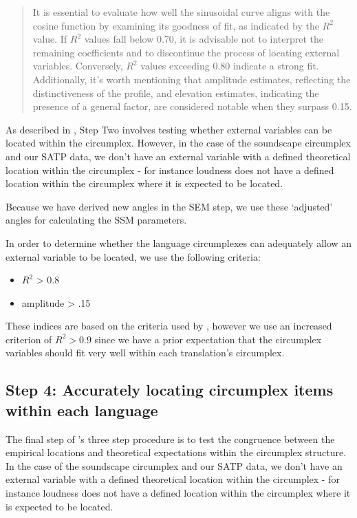 \documentclass[
  authoryear,
  preprint,
  3p]{elsarticle}
\providecommand{\tightlist}{%
  \setlength{\itemsep}{0pt}\setlength{\parskip}{0pt}}\usepackage{longtable,booktabs,array}
\begin{document}
\begin{quote}
It is essential to evaluate how well the sinusoidal curve aligns with
the cosine function by examining its goodness of fit, as indicated by
the \(R^2\) value. If \(R^2\) values fall below 0.70, it is advisable
not to interpret the remaining coefficients and to discontinue the
process of locating external variables. Conversely, \(R^2\) values
exceeding 0.80 indicate a strong fit. Additionally, it's worth
mentioning that amplitude estimates, reflecting the distinctiveness of
the profile, and elevation estimates, indicating the presence of a
general factor, are considered notable when they surpass 0.15.
\end{quote}

As described in \citet{Rogoza2021three}, Step Two involves testing
whether external variables can be located within the circumplex.
However, in the case of the soundscape circumplex and our SATP data, we
don't have an external variable with a defined theoretical location
within the circumplex - for instance loudness does not have a defined
location within the circumplex where it is expected to be located.

Because we have derived new angles in the SEM step, we use these
`adjusted' angles for calculating the SSM parameters.

In order to determine whether the language circumplexes can adequately
allow an external variable to be located, we use the following criteria:

\begin{itemize}
\tightlist
\item
  \(R^2\) \textgreater{} 0.8
\item
  amplitude \textgreater{} .15
\end{itemize}

These indices are based on the criteria used by \citet{Rogoza2021three},
however we use an increased criterion of \(R^2 > 0.9\) since we have a
prior expectation that the circumplex variables should fit very well
within each translation's circumplex.

\subsection{Step 4: Accurately locating circumplex items within each
language}\label{step-4-accurately-locating-circumplex-items-within-each-language}

The final step of \citet{Rogoza2021three} 's three step procedure is to
test the congruence between the empirical locations and theoretical
expectations within the circumplex structure. In the case of the
soundscape circumplex and our SATP data, we don't have an external
variable with a defined theoretical location within the circumplex - for
instance loudness does not have a defined location within the circumplex
where it is expected to be located.
\end{document}
